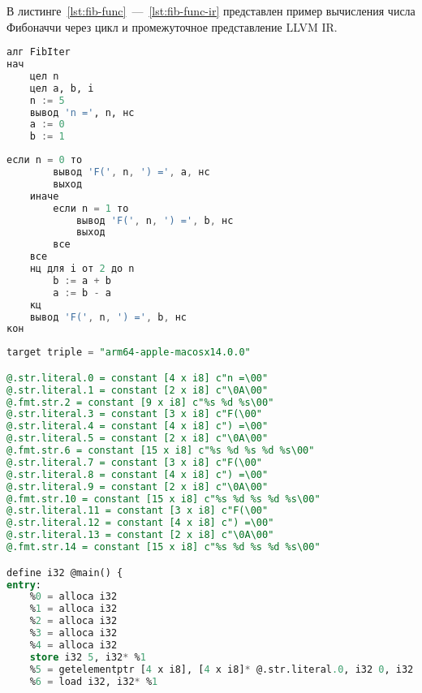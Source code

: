 В листинге~\ref{lst:fib-func}~---~\ref{lst:fib-func-ir} представлен пример вычисления числа Фибоначчи через цикл и промежуточное представление LLVM IR.

\begin{lstlisting}[language=sql, caption={Пример вычисления числа Фибоначчи через цикл}, label=lst:fib-func]
алг FibIter
нач
    цел n
    цел a, b, i
    n := 5
    вывод 'n =', n, нс
    a := 0
    b := 1
\end{lstlisting}

\newpage
\setcounter{lstlisting}{2}
\begin{lstlisting}[language=go, firstnumber=last, caption={Пример вычисления числа Фибоначчи через цикл}]
    если n = 0 то
        вывод 'F(', n, ') =', a, нс
        выход
    иначе
        если n = 1 то
            вывод 'F(', n, ') =', b, нс
            выход
        все
    все
    нц для i от 2 до n
        b := a + b
        a := b - a
    кц
    вывод 'F(', n, ') =', b, нс
кон
\end{lstlisting}

\begin{lstlisting}[language=sql, caption={Пример промежуточного представления LLVM IR для вычисления числа Фибоначчи через цикл}, label=lst:fib-func-ir]
target triple = "arm64-apple-macosx14.0.0"

@.str.literal.0 = constant [4 x i8] c"n =\00"
@.str.literal.1 = constant [2 x i8] c"\0A\00"
@.fmt.str.2 = constant [9 x i8] c"%s %d %s\00"
@.str.literal.3 = constant [3 x i8] c"F(\00"
@.str.literal.4 = constant [4 x i8] c") =\00"
@.str.literal.5 = constant [2 x i8] c"\0A\00"
@.fmt.str.6 = constant [15 x i8] c"%s %d %s %d %s\00"
@.str.literal.7 = constant [3 x i8] c"F(\00"
@.str.literal.8 = constant [4 x i8] c") =\00"
@.str.literal.9 = constant [2 x i8] c"\0A\00"
@.fmt.str.10 = constant [15 x i8] c"%s %d %s %d %s\00"
@.str.literal.11 = constant [3 x i8] c"F(\00"
@.str.literal.12 = constant [4 x i8] c") =\00"
@.str.literal.13 = constant [2 x i8] c"\0A\00"
@.fmt.str.14 = constant [15 x i8] c"%s %d %s %d %s\00"

define i32 @main() {
entry:
	%0 = alloca i32
	%1 = alloca i32
	%2 = alloca i32
	%3 = alloca i32
	%4 = alloca i32
	store i32 5, i32* %1
	%5 = getelementptr [4 x i8], [4 x i8]* @.str.literal.0, i32 0, i32 0
	%6 = load i32, i32* %1
\end{lstlisting}

